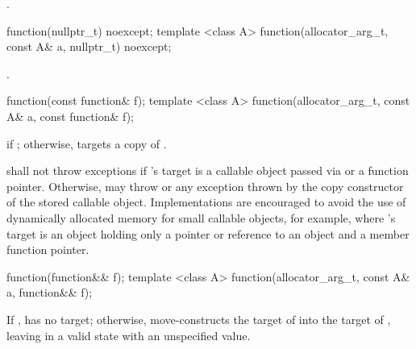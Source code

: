 \begin{itemdescr}
\pnum\postconditions {}.
\end{itemdescr}

\begin{itemdecl}
function(nullptr_t) noexcept;
template <class A> function(allocator_arg_t, const A& a, nullptr_t) noexcept;
\end{itemdecl}

\begin{itemdescr}
\pnum
\postconditions {}.
\end{itemdescr}

\begin{itemdecl}
function(const function& f);
template <class A> function(allocator_arg_t, const A& a, const function& f);
\end{itemdecl}

\begin{itemdescr}
\pnum
\postconditions {} if ; otherwise,
 targets a copy of .

\pnum
\throws shall not throw exceptions if 's target is
a callable object passed via  or
a function pointer. Otherwise, may throw 
or any exception thrown by the copy constructor of the stored callable object.
\enternote Implementations are encouraged to avoid the use of
dynamically allocated memory for small callable objects, for example, where
's target is an object holding only a pointer or reference
to an object and a member function pointer. \exitnote
\end{itemdescr}

\begin{itemdecl}
function(function&& f);
template <class A> function(allocator_arg_t, const A& a, function&& f);
\end{itemdecl}

\begin{itemdescr}
\pnum
\effects If ,  has
no target; otherwise, move-constructs the target of 
into the target of , leaving  in
a valid state with an unspecified value.
\end{itemdescr}

